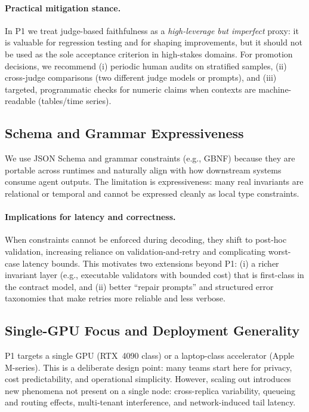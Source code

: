 \documentclass[11pt]{article}
\begin{document}
\paragraph{Practical mitigation stance.}
In P1 we treat judge-based faithfulness as a \emph{high-leverage but imperfect} proxy:
it is valuable for regression testing and for shaping improvements, but it should not be used as the sole acceptance criterion in high-stakes domains.
For promotion decisions, we recommend (i) periodic human audits on stratified samples, (ii) cross-judge comparisons (two different judge models or prompts), and (iii) targeted, programmatic checks for numeric claims when contexts are machine-readable (tables/time series).

\subsection{Schema and Grammar Expressiveness}

We use JSON Schema and grammar constraints (e.g., GBNF) because they are portable across runtimes and naturally align with how downstream systems consume agent outputs.
The limitation is expressiveness: many real invariants are relational or temporal and cannot be expressed cleanly as local type constraints.

\paragraph{Implications for latency and correctness.}
When constraints cannot be enforced during decoding, they shift to post-hoc validation, increasing reliance on validation-and-retry and complicating worst-case latency bounds.
This motivates two extensions beyond P1:
(i) a richer invariant layer (e.g., executable validators with bounded cost) that is first-class in the contract model, and
(ii) better ``repair prompts'' and structured error taxonomies that make retries more reliable and less verbose.

\subsection{Single-GPU Focus and Deployment Generality}

P1 targets a single GPU (RTX~4090 class) or a laptop-class accelerator (Apple M-series).
This is a deliberate design point: many teams start here for privacy, cost predictability, and operational simplicity.
However, scaling out introduces new phenomena not present on a single node: cross-replica variability, queueing and routing effects, multi-tenant interference, and network-induced tail latency.
\end{document}
